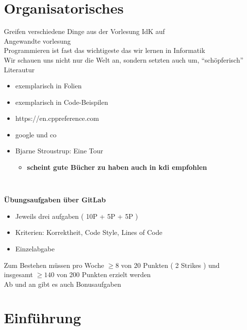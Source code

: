 \documentclass{gadsescript}
\begin{document}
\maketitle

\section{Organisatorisches}

Greifen verschiedene Dinge aus der Vorlesung IdK auf\\
Angewandte vorlesung\\
Programmieren ist fast das wichtigeste das wir lernen in Informatik\\
Wir schauen uns nicht nur die Welt an, sondern setzten auch um, ``schöpferisch''\\

Literautur
\begin{itemize}
	\item exemplarisch in Folien
	\item exemplarisch in Code-Beispilen
	\item https://en.cppreference.com
	\item google und co
	\item Bjarne Stroustrup: Eine Tour
		\begin{itemize}
			\item \textbf{scheint gute Bücher zu haben auch in kdi empfohlen}
		\end{itemize}
\end{itemize}
~\\\par

\textbf{Übungsaufgaben über GitLab}
\begin{itemize}
	\item Jeweils drei aufgaben ( 10P + 5P + 5P )
	\item Kriterien: Korrektheit, Code Style, Lines of Code
	\item Einzelabgabe
\end{itemize}
Zum Bestehen müssen pro Woche $ \geq 8 $ von 20 Punkten ( 2 Strikes ) und insgesamt $ \geq 140 $ von 200 Punkten erzielt werden\\
Ab und an gibt es auch Bonusaufgaben\\

\section{Einführung}
\end{document}
